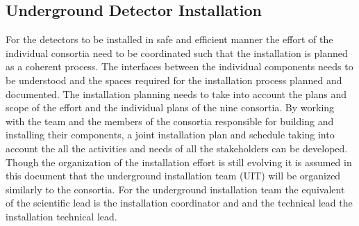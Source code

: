 




\subsection{Underground Detector Installation}
\label{sec:fdsp-coord-undergd}

For the  detectors to be installed in safe and efficient
manner the effort of the individual consortia need to be coordinated
such that the installation is planned as a coherent process. The
interfaces between the individual components needs to be understood
and the spaces required for the installation process planned and
documented. The installation planning needs to take into account the
plans and scope of the  effort and the individual plans of
the nine consortia. By working with the  team and the
members of the consortia responsible for building and installing their
components, a joint installation plan and schedule taking into account
the all the activities and needs of all the stakeholders can be
developed. Though the organization of the installation effort is still
evolving it is assumed in this document that the underground
installation team (UIT) will be organized similarly to the
consortia. For the underground installation team the equivalent of the
scientific lead is the installation coordinator and and the technical
lead the installation technical lead.

